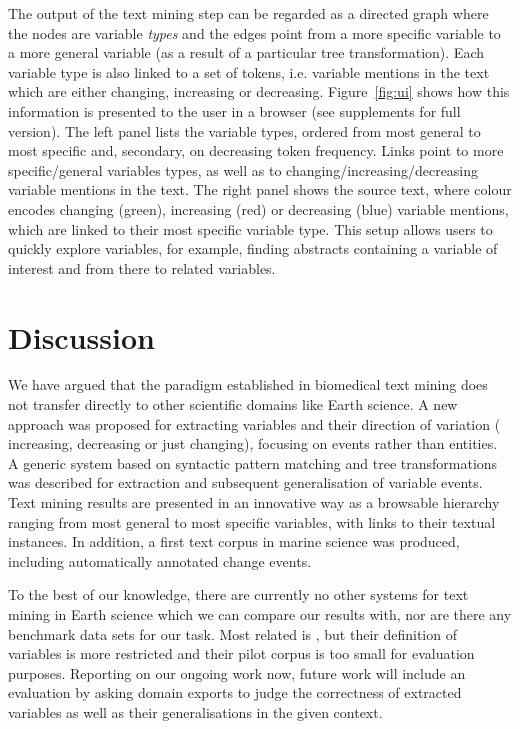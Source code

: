 \documentclass[11pt]{article}
\begin{document}
The output of the text mining step can be regarded as a directed graph where the nodes are variable \emph{types} and the edges point from a more specific variable to a more general variable (as a result of a particular tree transformation).
Each variable type is also linked to a set of tokens, i.e. variable mentions in the text which are either changing, increasing or decreasing.
Figure~\ref{fig:ui}  shows how this information is presented to the user in a browser (see supplements for full version).
The left panel lists the variable types, ordered from most general to most specific and, secondary, on decreasing token frequency.
Links point to more specific/general variables types, as well as to changing/increasing/decreasing variable mentions in the text.
The right panel shows the source text, where colour encodes changing (green), increasing (red) or decreasing (blue) variable mentions, which are linked to their most specific variable type.
This setup allows users to quickly explore variables, for example, finding abstracts containing a variable of interest and from there to related variables.   
 
\section{Discussion}

We have argued that the paradigm established in biomedical text mining does not transfer directly to other scientific domains like Earth science.
A new approach was proposed for extracting variables and their direction of variation ( increasing, decreasing or just changing), focusing on events rather than entities.
A generic system based on syntactic pattern matching and tree transformations was described for extraction and subsequent generalisation of variable events.
Text mining results are presented in an innovative way as a browsable hierarchy ranging from most general to most specific variables, with links to their textual instances.
In addition, a first text corpus in marine science was produced, including automatically annotated change events. 

To the best of our knowledge, there are currently no other systems for text mining in Earth science which we can compare our results with, nor are there any benchmark data sets for our task.
Most related is \cite{marsi2014towards}, but their definition of variables is more restricted and their pilot corpus is too small for evaluation purposes.
Reporting on our ongoing work now, future work will include an evaluation by asking domain exports to judge the correctness of extracted variables as well as their generalisations in the given context. 
\end{document}
